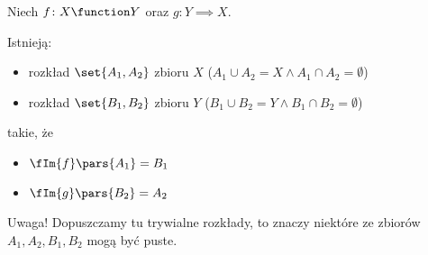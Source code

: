 \begin{lemma}[Banach]
	\label{mfi:banach_lemma}
	Niech \(f\colon X \function Y\) oraz \(g\colon Y \implies X\).

	Istnieją:
	\begin{itemize}
		\item rozkład \(\set{A_1, A_2}\) zbioru \(X\) (\(A_1 \cup A_2 = X \land A_1 \cap A_2 = \emptyset\))
		\item rozkład \(\set{B_1, B_2}\) zbioru \(Y\) (\(B_1 \cup B_2 = Y \land B_1 \cap B_2 = \emptyset\))
	\end{itemize}
	takie, że
	\begin{itemize}
		\item \(\fIm{f}\pars{A_1} = B_1\)
		\item \(\fIm{g}\pars{B_2} = A_2\)
	\end{itemize}
	Uwaga! Dopuszczamy tu trywialne rozkłady, to znaczy niektóre ze zbiorów \(A_1, A_2, B_1, B_2\) mogą być puste.
\end{lemma}
